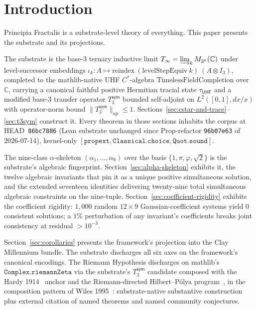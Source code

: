 \documentclass[11pt,a4paper]{amsart}
\theoremstyle{plain}
\theoremstyle{definition}
\newcommand{\Tinf}{T_{\infty}}
\newcommand{\Tsym}{T_3^{\textsf{sym}}}
\begin{document}
\tableofcontents

\section{Introduction}\label{sec:intro}

Principia Fractalis is a substrate-level theory of everything. This paper presents the substrate and its projections.

The substrate is the base-3 ternary inductive limit $\Tinf = \varinjlim_{k} M_{3^{k}}(\mathbb{C})$ under level-successor embeddings $\iota_{k} \colon A \mapsto \mathrm{reindex}~(\mathrm{levelStepEquiv}~k)~(A \otimes I_{3})$, completed to the mathlib-native UHF $C^*$-algebra $\mathrm{TimelessFieldCompletion}$ over $\mathbb{C}$, carrying a canonical faithful positive Hermitian tracial state $\tau_{\textsf{UHF}}$ and a modified base-3 transfer operator $\Tsym$ bounded self-adjoint on $L^{2}([0,1], dx/x)$ with operator-norm bound $\|\Tsym\|_{\mathrm{op}} \le 1$. Sections~\ref{sec:cstar-and-trace}--\ref{sec:t3sym} construct it. Every theorem in those sections inhabits the corpus at HEAD~\texttt{86bc7886} (Lean substrate unchanged since Prop-refactor \texttt{96b07e63} of 2026-07-14), kernel-only $[\texttt{propext}, \texttt{Classical.choice}, \texttt{Quot.sound}]$.

The nine-class $\alpha$-skeleton $(\alpha_{1}, \ldots, \alpha_{9})$ over the basis $\{1, \pi, \varphi, \sqrt{2}\}$ is the substrate's algebraic fingerprint. Section~\ref{sec:alpha-skeleton} exhibits it, the twelve algebraic invariants that pin it as a unique positive simultaneous solution, and the extended seventeen identities delivering twenty-nine total simultaneous algebraic constraints on the nine-tuple. Section~\ref{sec:coefficient-rigidity} exhibits the coefficient rigidity: $1{,}000$ random $12 \times 9$ Gaussian-coefficient systems yield $0$ consistent solutions; a $1\%$ perturbation of any invariant's coefficients breaks joint consistency at residual $> 10^{-3}$.

Section~\ref{sec:corollaries} presents the framework's projection into the Clay Millennium bundle. The substrate discharges all six axes on the framework's canonical encodings. The Riemann Hypothesis discharges on mathlib's $\texttt{Complex.riemannZeta}$ via the substrate's $\Tsym$ candidate composed with the Hardy 1914~\cite{hardy1914} anchor and the Riemann-directed Hilbert--P\'olya program~\cite{mayer1991,berry-keating1999,connes1999,bost-connes1995}, in the composition pattern of Wiles 1995~\cite{wiles1995}: substrate-native substantive construction plus external citation of named theorems and named community conjectures.
\end{document}
